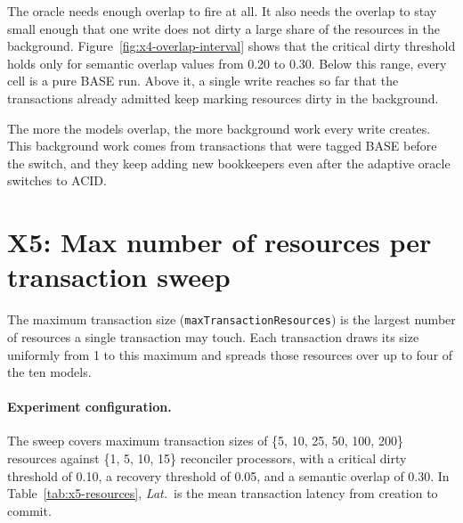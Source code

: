 \begin{bullets}
  \item[O10. The critical dirty threshold does not hold for all semantic overlap values.] The
  oracle needs enough overlap to fire at all. It also needs the overlap to stay
  small enough that one write does not dirty a large share of the resources in
  the background. Figure~\ref{fig:x4-overlap-interval} shows that the critical
  dirty threshold holds only for semantic overlap values from 0.20 to 0.30.
  Below this range, every cell is a pure BASE run. Above it, a single write
  reaches so far that the transactions already admitted keep marking resources
  dirty in the background.

  \item[O11. In-flight BASE transactions overflow the critical dirty threshold.]
  The more the models overlap, the more background work every write creates.
  This background work comes from transactions that were tagged BASE before the
  switch, and they keep adding new bookkeepers even after the adaptive oracle
  switches to ACID.
\end{bullets}

\section{X5: Max number of resources per transaction
  sweep}\label{sec:x5-resources-sweep}

The maximum transaction size (\texttt{maxTransactionResources}) is the largest
number of resources a single transaction may touch. Each transaction draws its
size uniformly from 1 to this maximum and spreads those resources over up to
four of the ten models.

\paragraph{Experiment configuration.} The sweep covers maximum transaction sizes
of \{5, 10, 25, 50, 100, 200\} resources against \{1, 5, 10, 15\} reconciler
processors, with a critical dirty threshold of 0.10, a recovery threshold of
0.05, and a semantic overlap of 0.30. In Table~\ref{tab:x5-resources}, \emph{Lat.}\ is the
mean transaction latency from creation to commit.

